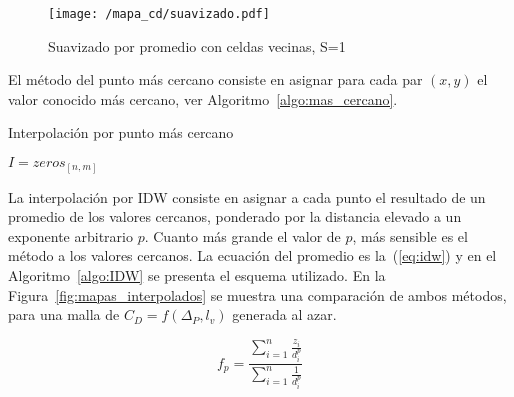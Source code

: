 \begin{figure}
    \centering
    \texttt{[image: /mapa\_cd/suavizado.pdf]}
    \caption{Suavizado por promedio con celdas vecinas, S=1}\label{fig:suavizado_promedio}
\end{figure}


El método del punto más cercano consiste en asignar para cada par $(x, y)$ el
valor conocido más cercano, ver Algoritmo~\ref{algo:mas_cercano}.

\begin{algorithm}
 \caption{Interpolación por punto más cercano}\label{algo:mas_cercano}


    \BlankLine
     $I=zeros_{[n,m]}$\;
\end{algorithm}

La interpolación por IDW consiste en asignar a cada punto el resultado de un
promedio de los valores cercanos, ponderado por la distancia elevado a un
exponente arbitrario $p$.
%
Cuanto más grande el valor de $p$, más sensible es el método a los valores
cercanos.
%
La ecuación del promedio es la~(\ref{eq:idw}) y en el Algoritmo~\ref{algo:IDW}
se presenta el esquema utilizado.
%
En la Figura~\ref{fig:mapas_interpolados} se muestra una comparación de ambos
métodos, para una malla de $C_{D}=f(\Delta_{P}, l_{v})$ generada al azar.

\begin{equation} \label{eq:idw}
    f_p = \frac{\sum_{i=1}^{n} \frac{z_i}{d_i^p}} {\sum_{i=1}^{n}
    \frac{1}{d_i^p}}
\end{equation}

